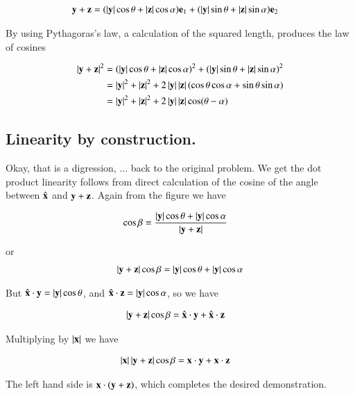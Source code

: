 \documentclass{article}
\begin{document}
\begin{align*}
\By + \Bz &= (\Abs{\By} \cos\theta + \Abs{\Bz} \cos\alpha )\Be_1 + (\Abs{\By} \sin\theta + \Abs{\Bz} \sin\alpha ) \Be_2
\end{align*}

By using Pythagoras's law, a calculation of the squared length, produces the law of cosines

\begin{align*}
\Abs{\By + \Bz}^2 
&= (\Abs{\By} \cos\theta + \Abs{\Bz} \cos\alpha )^2 + (\Abs{\By} \sin\theta + \Abs{\Bz} \sin\alpha )^2 \\
&= \Abs{\By}^2 + \Abs{\Bz}^2 + 2 \Abs{\By} \Abs{\Bz} (\cos\theta \cos\alpha + \sin\theta \sin\alpha) \\
&= \Abs{\By}^2 + \Abs{\Bz}^2 + 2 \Abs{\By} \Abs{\Bz} \cos(\theta -\alpha) \\
\end{align*}

\subsection{Linearity by construction. }

Okay, that is a digression, ... back to the original problem.  We get the dot product linearity follows from direct calculation
of the cosine of the angle between $\xcap$ and $\By + \Bz$.  Again from the figure we have

\begin{align*}
\cos\beta &= \frac{\Abs{\By}\cos\theta + \Abs{\By}\cos\alpha}{\Abs{\By + \Bz}}
\end{align*}

or
\begin{align*}
{\Abs{\By + \Bz}} \cos\beta &= {\Abs{\By}\cos\theta + \Abs{\By}\cos\alpha} \\
\end{align*}

But $\xcap \cdot \By = \Abs{\By}\cos\theta $, and $\xcap \cdot \Bz = \Abs{\By}\cos\alpha $, so we have

\begin{align*}
{\Abs{\By + \Bz}} \cos\beta &= \xcap \cdot \By + \xcap \cdot \Bz
\end{align*}

Multiplying by $\Abs{\Bx}$ we have

\begin{align*}
\Abs{\Bx} {\Abs{\By + \Bz}} \cos\beta &= \Bx \cdot \By + \Bx \cdot \Bz
\end{align*}

The left hand side is $\Bx \cdot (\By + \Bz)$, which completes the desired demonstration.



\end{document}
